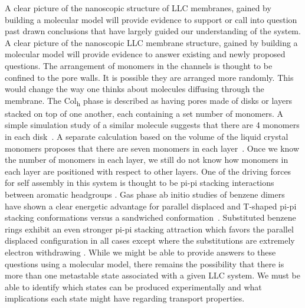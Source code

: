 A clear picture of the nanoscopic structure of LLC membranes, gained by
building a molecular model will provide evidence to support or call
into question past drawn conclusions that have largely guided our 
understanding of the system. 
A clear picture of the nanoscopic LLC membrane structure, gained by building 
a molecular model will provide evidence to answer existing and newly proposed
questions.
The arrangement of monomers
in the channels is thought to be confined to the pore walls. It is 
possible they are arranged more randomly. This would change the way
one thinks about molecules diffusing through the membrane. The
Col\textsubscript{h} phase is described as having pores made of disks or
layers stacked
on top of one another, each containing a set number of monomers. A 
simple simulation study of a similar molecule suggests that there are 4
monomers in each disk~\cite{zhu_methacrylated_2006}. A separate calculation
based on the volume of the liquid crystal monomers proposes that there 
are seven monomers in each layer~\cite{resel_structural_2000}. Once we %
know the number of monomers in each layer, we still do not know how 
monomers in each layer are positioned with respect to other layers. 
One of the driving forces for self %
assembly in this system is thought to be pi-pi stacking interactions
between aromatic headgroups \cite{gazit_possible_2002}. Gas phase ab
initio studies of benzene dimers have shown a clear energetic advantage
for parallel displaced and T-shaped pi-pi stacking conformations versus a
sandwiched conformation~\cite{sinnokrot_estimates_2002}.
Substituted benzene rings exhibit an even stronger pi-pi stacking 
attraction which favors the parallel displaced configuration in all cases
except where the substitutions are extremely electron withdrawing
\cite{waller_hybrid_2006,ringer_effect_2006}. While we might be able to
provide answers to these questions using a molecular model, there remains
the possibility that there is more than one metastable state associated
with a given LLC system. We must be able to identify which states can
be produced experimentally and what implications each state might have
regarding transport properties.

